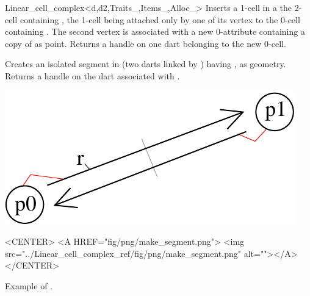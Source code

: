 \begin{ccRefClass}{Linear_cell_complex<d,d2,Traits_,Items_,Alloc_>}
{Inserts a 1-cell in a the 2-cell containing , the 1-cell
  being attached only by one of its vertex to the 0-cell containing .
  The second vertex is associated with a new 0-attribute containing a copy of
   as point. Returns a handle on one dart belonging to the new 0-cell.
}


{Creates an isolated segment in  (two darts linked by \betadeux{}) 
  having ,  as geometry.
  Returns a handle on the dart associated with .
}
% 
\def\LargFig{.3\textwidth}
\begin{ccTexOnly}
  \begin{center}
    \includegraphics[width=\LargFig]{Linear_cell_complex_ref/fig/pdf/make_segment}
  \end{center}
\end{ccTexOnly}
\begin{ccHtmlOnly}
  <CENTER>
  <A HREF="fig/png/make_segment.png">
  <img src="../Linear_cell_complex_ref/fig/png/make_segment.png" alt=""></A>
  </CENTER>
\end{ccHtmlOnly}
\centerline{Example of .}


\end{ccRefClass}

